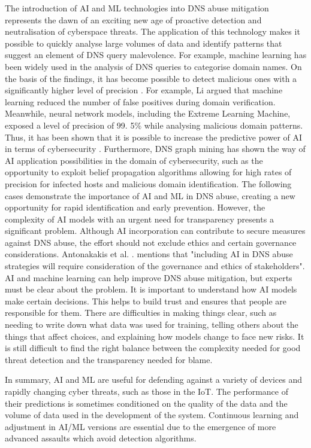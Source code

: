 The introduction of AI and ML technologies into DNS abuse mitigation represents the dawn of an exciting new age of proactive detection and neutralisation of cyberspace threats\cite{tariq2023critical}. The application of this technology makes it possible to quickly analyse large volumes of data and identify patterns that suggest an element of DNS query malevolence. For example, machine learning has been widely used in the analysis of DNS queries to categorise domain names. On the basis of the findings, it has become possible to detect malicious ones with a significantly higher level of precision \cite{LiMaliciousDomainDetection2020}. For example, Li argued that machine learning reduced the number of false positives during domain verification. Meanwhile, neural network models, including the Extreme Learning Machine, exposed a level of precision of 99. 5\% while analysing malicious domain patterns. Thus, it has been shown that it is possible to increase the predictive power of AI in terms of cybersecurity \cite{ZouDNSGraphMining2015}. Furthermore, DNS graph mining has shown the way of AI application possibilities in the domain of cybersecurity, such as the opportunity to exploit belief propagation algorithms allowing for high rates of precision for infected hosts and malicious domain identification. The following cases demonstrate the importance of AI and ML in DNS abuse, creating a new opportunity for rapid identification and early prevention. However, the complexity of AI models with an urgent need for transparency presents a significant problem. Although AI incorporation can contribute to secure measures against DNS abuse, the effort should not exclude ethics and certain governance considerations. Antonakakis et al. \cite{AntonakakisMalwareDomainsUpperDNS2011}. mentions that "including AI in DNS abuse strategies will require consideration of the governance and ethics of stakeholders". AI and machine learning can help improve DNS abuse mitigation, but experts must be clear about the problem.  It is important to understand how AI models make certain decisions. This helps to build trust and ensures that people are responsible for them. There are difficulties in making things clear, such as needing to write down what data was used for training, telling others about the things that affect choices, and explaining how models change to face new risks. It is still difficult to find the right balance between the complexity needed for good threat detection and the transparency needed for blame.

In summary, AI and ML are useful for defending against a variety of devices and rapidly changing cyber threats, such as those in the IoT. The performance of their predictions is sometimes conditioned on the quality of the data and the volume of data used in the development of the system. Continuous learning and adjustment in AI/ML versions are essential due to the emergence of more advanced assaults which avoid detection algorithms.


